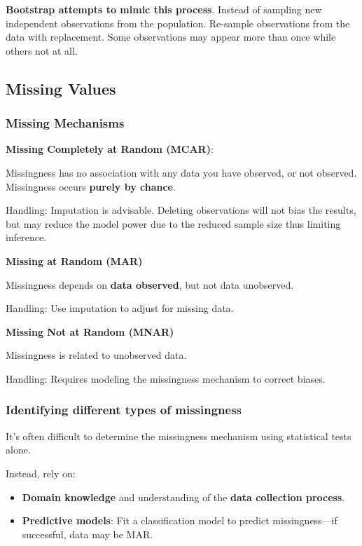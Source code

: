 \textbf{Bootstrap attempts to mimic this process}. Instead of sampling new independent observations from the population. Re-sample observations from the data with replacement. Some observations may appear more than once while others not at all.

\subsection{Missing Values}

\subsubsection{Missing Mechanisms}

\indent 

\noindent \textbf{Missing Completely at Random (MCAR)}:

Missingness has no association with any data you have observed, or not observed. Missingness occurs \textbf{purely by chance}.

Handling: Imputation is advisable. Deleting observations will not bias the results, but may reduce the model power due to the reduced sample size thus limiting inference.

\bigskip

\noindent\textbf{Missing at Random (MAR)}

Missingness depends on \textbf{data observed}, but not data unobserved.

Handling: Use imputation to adjust for missing data.

\bigskip

\noindent\textbf{Missing Not at Random (MNAR)}

Missingness is related to unobserved data.

Handling: Requires modeling the missingness mechanism to correct biases.

\subsubsection{Identifying different types of missingness}

\indent 

It’s often difficult to determine the missingness mechanism using statistical tests alone.

Instead, rely on:

\begin{itemize}
    \item \textbf{Domain knowledge} and understanding of the \textbf{data collection process}.
    \item \textbf{Predictive models}: Fit a classification model to predict missingness—if successful, data may be MAR.
\end{itemize}

